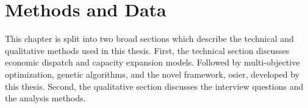 \chapter{Methods and Data}

This chapter is split into two broad sections which describe the technical
and qualitative methods used in this thesis. First, the technical section
discusses economic dispatch and capacity expansion models. Followed by 
multi-objective optimization, genetic algorithms, and the novel framework, 
\ac{osier}, developed by this thesis. Second, the qualitative section 
discusses the interview questions and the analysis methods.



